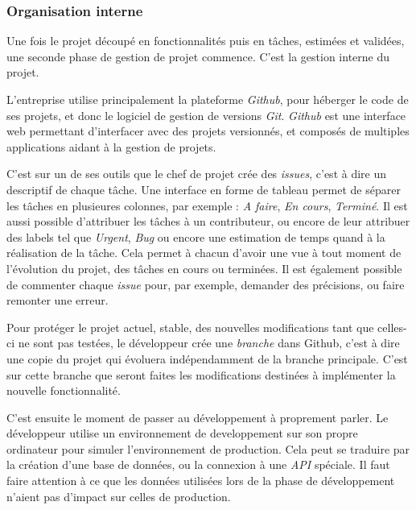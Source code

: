 \documentclass[12pt,a4paper]{article}
\begin{document}
  \bigskip

  \subsubsection{Organisation interne}\label{organisation-interne}

  \bigskip

  Une fois le projet découpé en fonctionnalités puis en tâches, estimées
  et validées, une seconde phase de gestion de projet commence. C'est la
  gestion interne du projet.

  L'entreprise utilise principalement la plateforme \emph{Github}, pour
  héberger le code de ses projets, et donc le logiciel de gestion de
  versions \emph{Git}. \emph{Github} est une interface web permettant
  d'interfacer avec des projets versionnés, et composés de multiples
  applications aidant à la gestion de projets.

  \bigskip

  C'est sur un de ses outils que le chef de projet crée des \emph{issues},
  c'est à dire un descriptif de chaque tâche. Une interface en forme de
  tableau permet de séparer les tâches en plusieures colonnes, par exemple
  : \emph{A faire}, \emph{En cours}, \emph{Terminé}. Il est aussi possible
  d'attribuer les tâches à un contributeur, ou encore de leur attribuer
  des labels tel que \emph{Urgent}, \emph{Bug} ou encore une estimation de
  temps quand à la réalisation de la tâche. Cela permet à chacun d'avoir
  une vue à tout moment de l'évolution du projet, des tâches en cours ou
  terminées. Il est également possible de commenter chaque \emph{issue}
  pour, par exemple, demander des précisions, ou faire remonter une
  erreur.

  \bigskip

  Pour protéger le projet actuel, stable, des nouvelles modifications tant
  que celles-ci ne sont pas testées, le développeur crée une
  \emph{branche} dans Github, c'est à dire une copie du projet qui
  évoluera indépendamment de la branche principale. C'est sur cette
  branche que seront faites les modifications destinées à implémenter la
  nouvelle fonctionnalité.

  \bigskip

  C'est ensuite le moment de passer au développement à proprement parler.
  Le développeur utilise un environnement de developpement sur son propre
  ordinateur pour simuler l'environnement de production. Cela peut se
  traduire par la création d'une base de données, ou la connexion à une
  \emph{API} spéciale. Il faut faire attention à ce que les données
  utilisées lors de la phase de développement n'aient pas d'impact sur
  celles de production.
\end{document}
